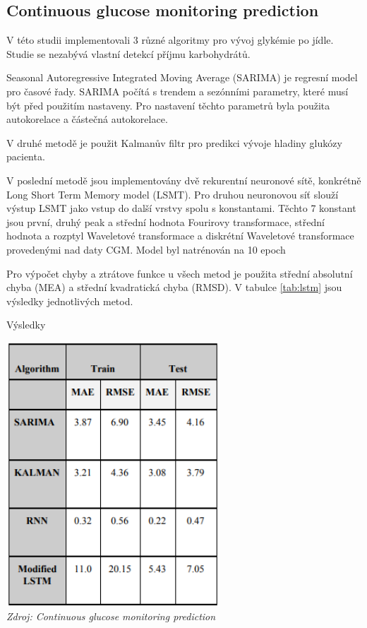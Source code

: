 \subsection{Continuous glucose monitoring prediction}

V této studii \citet{Analyza.LSTM} implementovali 3 různé algoritmy pro vývoj glykémie po jídle. Studie se nezabývá vlastní detekcí příjmu karbohydrátů.

Seasonal Autoregressive Integrated Moving Average (SARIMA) je regresní model pro časové řady. SARIMA počítá s trendem a sezónními parametry, které musí být před použitím nastaveny. Pro nastavení těchto parametrů byla použita autokorelace a částečná autokorelace.

V druhé metodě je použit Kalmanův filtr pro predikci vývoje hladiny glukózy pacienta.

V poslední metodě jsou implementovány dvě rekurentní neuronové sítě, konkrétně Long Short Term Memory model (LSMT). Pro druhou neuronovou síť slouží výstup LSMT jako vstup do další vrstvy spolu s konstantami. Těchto 7 konstant jsou první, druhý peak a střední hodnota Fourirovy transformace, střední hodnota a rozptyl Waveletové transformace a diskrétní Waveletové transformace provedenými nad daty CGM. Model byl natrénován na 10 epoch

Pro výpočet chyby a ztrátove funkce u všech metod je použita střední absolutní chyba (MEA) a střední kvadratická chyba (RMSD). V tabulce \ref{tab:lstm} jsou výsledky jednotlivých metod.

\begin{table}[H]
\caption{Výsledky}
\label{tab:lstm}
\centering
\includegraphics[width=0.6\textwidth]{img/analyza/lstm.png}\\
\textit{Zdroj: Continuous glucose monitoring prediction \citep{Analyza.LSTM}}
\end{table}


